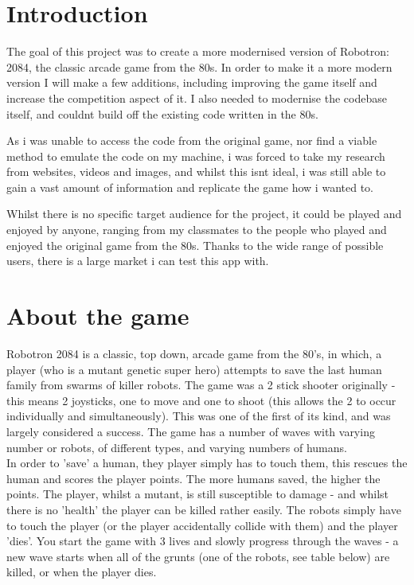 \section{Introduction}
The goal of this project was to create a more modernised version of Robotron: 2084, the classic arcade game from the 80s. In order to make it a more modern version I will make a few additions, including improving the game itself and increase the competition aspect of it. I also needed to modernise the codebase itself, and couldnt build off the existing code written in the 80s.

As i was unable to access the code from the original game, nor find a viable method to emulate the code on my machine, i was forced to take my research from websites, videos and images, and whilst this isnt ideal, i was still able to gain a vast amount of information and replicate the game how i wanted to.

Whilst there is no specific target audience for the project, it could be played and enjoyed by anyone, ranging from my classmates to the people who played and enjoyed the original game from the 80s. Thanks to the wide range of possible users, there is a large market i can test this app with.

\section{About the game}

Robotron 2084 is a classic, top down, arcade game from the 80's, in which, a player (who is a mutant genetic super hero) attempts to save the last human family from swarms of killer robots. The game was a 2 stick shooter originally - this means 2 joysticks, one to move and one to shoot (this allows the 2 to occur individually and simultaneously). This was one of the first of its kind, and was largely considered a success. The game has a number of waves with varying number or robots, of different types, and varying numbers of humans.\\

In order to 'save' a human, they player simply has to touch them, this rescues the human and scores the player points. The more humans saved, the higher the points. The player, whilst a mutant, is still susceptible to damage - and whilst there is no 'health' the player can be killed rather easily. The robots simply have to touch the player (or the player accidentally collide with them) and the player 'dies'. You start the game with 3 lives and slowly progress through the waves - a new wave starts when all of the grunts (one of the robots, see table below) are killed, or when the player dies. \\

